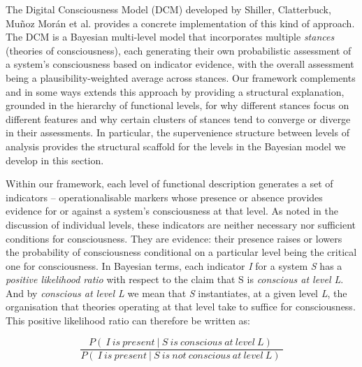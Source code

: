 \documentclass[11pt, a4paper, onecolumn, gdm]{google}
\begin{document}
The Digital Consciousness Model (DCM) developed by Shiller, Clatterbuck, Mu\~noz Mor\'an et al. \citeyearpar{shiller2026} provides a concrete implementation of this kind of approach.
The DCM is a Bayesian multi-level model that incorporates multiple \emph{stances} (theories of consciousness), each generating their own probabilistic assessment of a system's consciousness based on indicator evidence, with the overall assessment being a plausibility-weighted average across stances.
Our framework complements and in some ways extends this approach by providing a structural explanation, grounded in the hierarchy of functional levels, for why different stances focus on different features and why certain clusters of stances tend to converge or diverge in their assessments.
In particular, the supervenience structure between levels of analysis provides the structural scaffold for the levels in the Bayesian model we develop in this section.

Within our framework, each level of functional description generates a set of indicators -- operationalisable markers whose presence or absence provides evidence for or against a system's consciousness at that level.
As noted in the discussion of individual levels, these indicators are neither necessary nor sufficient conditions for consciousness.
They are evidence: their presence raises or lowers the probability of consciousness conditional on a particular level being the critical one for consciousness.
In Bayesian terms, each indicator \emph{I} for a system \emph{S} has a \emph{positive likelihood ratio} with respect to the claim that S is \textquotesingle{}\emph{conscious at level L}\textquotesingle.
And by \textquotesingle{}\emph{conscious at level L}\textquotesingle{} we mean that \emph{S} instantiates, at a given level \emph{L}, the organisation that theories operating at that level take to suffice for consciousness.
This positive likelihood ratio can therefore be written as:

\[
\frac{P(\ I\ is\ present\ |\ S\ is\ conscious\ at\ level\ L)\ }{P(\ I\ is\ present\ |\ S\ is\ not\ conscious\ at\ level\ L)\ }
\]
\end{document}
